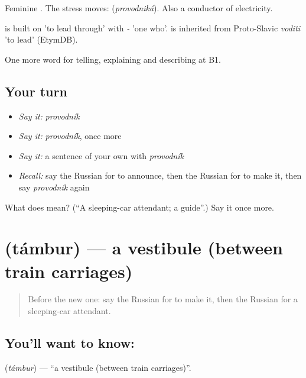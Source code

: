 Feminine \emph{}. The stress moves: \emph{} (\emph{provodniká}). Also a conductor of electricity.

\begin{cousinweb}
\emph{} is built on \emph{} 'to lead through' with \emph{-} 'one who'. \emph{} is inherited from Proto-Slavic \emph{voditi} 'to lead' (EtymDB).
\end{cousinweb}

\begin{grammarlens}[title={What you've built}]
One more word for telling, explaining and describing at B1.
\end{grammarlens}

\subsection*{Your turn}
\begin{itemize}
\raggedright
  \item \emph{Say it:} \emph{provodník}
  \item \emph{Say it:} \emph{provodník}, once more
  \item \emph{Say it:} a sentence of your own with \emph{provodník}
  \item \emph{Recall:} say the Russian for to announce, then the Russian for to make it, then say \emph{provodník} again
\end{itemize}

\begin{tcolorbox}[breakable,colback=teal!4,colframe=teal!35!black,title={Before you move on}]
What does  mean? (\textquotedblleft{}A sleeping-car attendant; a guide\textquotedblright{}.) Say it once more.
\end{tcolorbox}
\section[\texorpdfstring{\ru{тамбур} (támbur)}{тамбур (támbur)}]{ (támbur) — a vestibule (between train carriages)}

\label{lesson:RU-C416-tambur}



\begin{quote}
Before the new one: say the Russian for to make it, then the Russian for a sleeping-car attendant.
\end{quote}

\subsection*{You'll want to know: }
\textbf{} (\emph{támbur}) — \textquotedblleft{}a vestibule (between train carriages)\textquotedblright{}.

